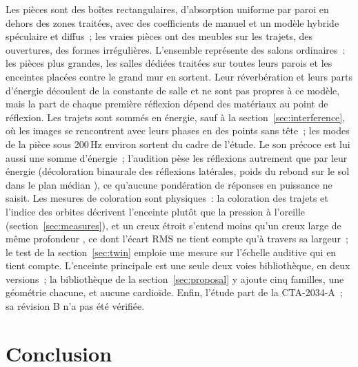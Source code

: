 \documentclass[11pt,a4paper]{article}
\begin{document}
Les pièces sont des boîtes rectangulaires, d'absorption uniforme par paroi en dehors des zones
traitées, avec des coefficients de manuel et un modèle hybride spéculaire et diffus~; les vraies pièces
ont des meubles sur les trajets, des ouvertures, des formes irrégulières. L'ensemble représente des
salons ordinaires~: les pièces plus grandes, les salles dédiées traitées sur toutes leurs parois et les
enceintes placées contre le grand mur en sortent. Leur réverbération et leurs
parts d'énergie découlent de la constante de salle et ne sont pas propres à ce modèle, mais la part de
chaque première réflexion dépend des matériaux au point de réflexion. Les trajets sont sommés en
énergie, sauf à la section~\ref{sec:interference}, où les images se rencontrent avec leurs phases en des
points sans tête~; les modes de la pièce sous 200\,Hz environ sortent du cadre de l'étude. Le son précoce est lui aussi une somme d'énergie~; l'audition pèse les réflexions
autrement que par leur énergie (décoloration binaurale des réflexions latérales, poids du rebond sur le
sol dans le plan médian \cite{bech1996,olive1989}), ce qu'aucune pondération de réponses en puissance ne
saisit. Les mesures de coloration sont physiques~: la coloration des trajets et l'indice des orbites
décrivent l'enceinte plutôt que la pression à l'oreille (section~\ref{sec:measures}), et un creux étroit
s'entend moins qu'un creux large de même profondeur \cite{bucklein1981}, ce dont l'écart RMS ne tient
compte qu'à travers sa largeur~; le test de la section~\ref{sec:twin} emploie une mesure sur l'échelle
auditive qui en tient compte.
L'enceinte principale est une seule deux voies bibliothèque, en deux versions~; la bibliothèque de la
section~\ref{sec:proposal} y ajoute cinq familles, une géométrie chacune, et aucune cardioïde. Enfin, l'étude
part de la CTA-2034-A~; sa révision B n'a pas été vérifiée.

\section{Conclusion}
\end{document}
